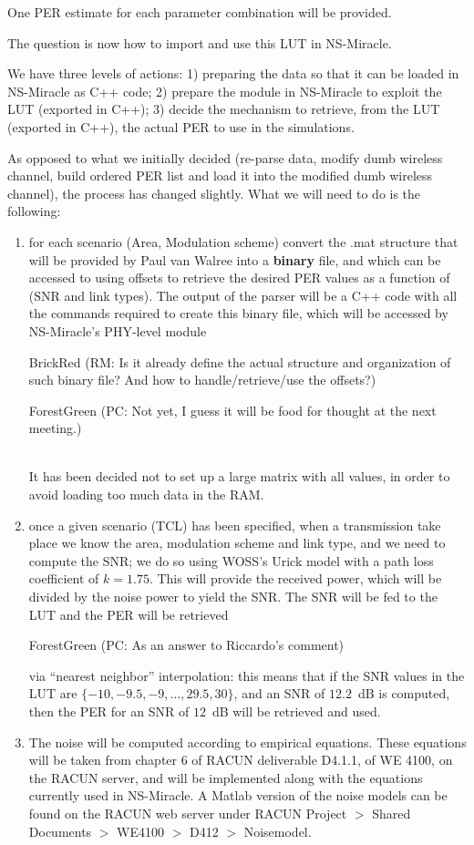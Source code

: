 \documentclass[11pt,journal,draftclsnofoot,onecolumn,twoside,letterpaper]{IEEEtran}
\newcommand{\RM}[1]{\begin{color}{BrickRed} (RM: #1) \end{color}}
\newcommand{\PC}[1]{\begin{color}{ForestGreen} (PC: #1) \end{color}}
\theoremstyle{definition} \newtheorem{definition}[]{Definition}
\theoremstyle{theorem} \newtheorem{theorem}[]{Theorem}
\begin{document}
One PER estimate for each parameter combination will be provided.

The question is now how to import and use this LUT in NS-Miracle.

We have three levels of actions: 1) preparing the data so that it can be loaded in NS-Miracle as C++ code; 2) prepare the module in NS-Miracle to exploit the LUT (exported in C++); 3) decide the mechanism to retrieve, from the LUT (exported in C++), the actual PER to use in the simulations.

As opposed to what we initially decided (re-parse data, modify dumb wireless channel, build ordered PER list and load it into the modified dumb wireless channel), the process has changed slightly. What we will need to do is the following:
\begin{enumerate}
 \item for each scenario (Area, Modulation scheme) convert the .mat structure that will be provided by Paul van Walree into a \textbf{binary} file, and which can be accessed to using offsets to retrieve the desired PER values as a function of (SNR and link types). The output of the parser will be a C++ code with all the commands required to create this binary file, which will be accessed by NS-Miracle's PHY-level module \RM{Is it already define the actual structure and organization of such binary file? And how to handle/retrieve/use the offsets?} \PC{Not yet, I guess it will be food for thought at the next meeting.}\\
 It has been decided not to set up a large matrix with all values, in order to avoid loading too much data in the RAM.  
 \item once a given scenario (TCL) has been specified, when a transmission take place we know the area, modulation scheme and link type, and we need to compute the SNR; we do so using WOSS's Urick model with a path loss coefficient of $k=1.75$. This will provide the received power, which will be divided by the noise power to yield the SNR. The SNR will be fed to the LUT and the PER will be retrieved \PC{As an answer to Riccardo's comment} via ``nearest neighbor'' interpolation: this means that if the SNR values in the LUT are $\{ -10, -9.5, -9, \ldots , 29.5, 30\}$, and an SNR of $12.2$~dB is computed, then the PER for an SNR of $12$~dB will be retrieved and used.
 \item The noise will be computed according to empirical equations. These equations will be taken from chapter 6 of RACUN deliverable D4.1.1, of WE 4100, on the RACUN server, and will be implemented along with the equations currently used in NS-Miracle. A Matlab version of the noise models can be found on the RACUN web server under RACUN Project $>$ Shared Documents $>$ WE4100 $>$ D412 $>$ Noisemodel.

\end{enumerate}
\end{document}

